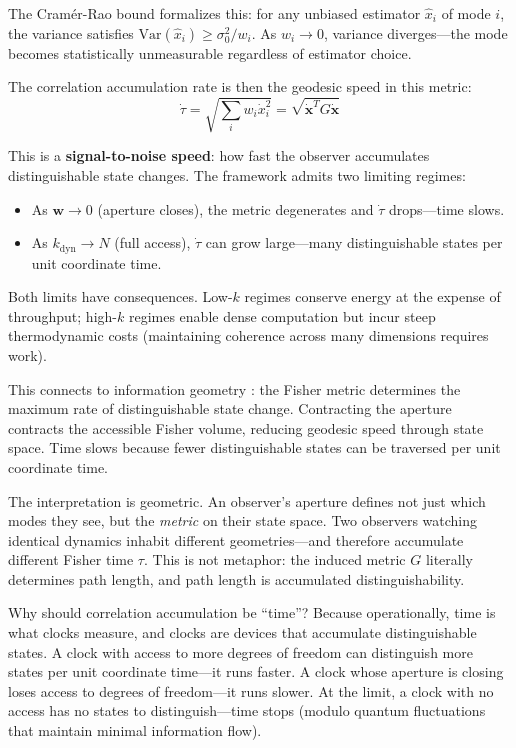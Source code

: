 \documentclass[11pt,a4paper]{article}
\begin{document}
The Cram\'{e}r-Rao bound formalizes this: for any unbiased estimator $\hat{x}_i$ of mode $i$, the variance satisfies $\mathrm{Var}(\hat{x}_i) \geq \sigma_0^2/w_i$. As $w_i \to 0$, variance diverges---the mode becomes statistically unmeasurable regardless of estimator choice.

The correlation accumulation rate is then the geodesic speed in this metric:
\begin{equation}
    \dot{\tau} = \sqrt{\sum_i w_i \dot{x}_i^2} = \sqrt{\dot{\mathbf{x}}^T G \dot{\mathbf{x}}}
\end{equation}

This is a \textbf{signal-to-noise speed}: how fast the observer accumulates distinguishable state changes. The framework admits two limiting regimes:
\begin{itemize}
    \item As $\mathbf{w} \to 0$ (aperture closes), the metric degenerates and $\dot{\tau}$ drops---time slows.
    \item As $k_{\mathrm{dyn}} \to N$ (full access), $\dot{\tau}$ can grow large---many distinguishable states per unit coordinate time.
\end{itemize}
Both limits have consequences. Low-$k$ regimes conserve energy at the expense of throughput; high-$k$ regimes enable dense computation but incur steep thermodynamic costs (maintaining coherence across many dimensions requires work).

This connects to information geometry \cite{amari2000}: the Fisher metric determines the maximum rate of distinguishable state change. Contracting the aperture contracts the accessible Fisher volume, reducing geodesic speed through state space. Time slows because fewer distinguishable states can be traversed per unit coordinate time.

The interpretation is geometric. An observer's aperture defines not just which modes they see, but the \emph{metric} on their state space. Two observers watching identical dynamics inhabit different geometries---and therefore accumulate different Fisher time $\tau$. This is not metaphor: the induced metric $G$ literally determines path length, and path length is accumulated distinguishability.

Why should correlation accumulation be ``time''? Because operationally, time is what clocks measure, and clocks are devices that accumulate distinguishable states. A clock with access to more degrees of freedom can distinguish more states per unit coordinate time---it runs faster. A clock whose aperture is closing loses access to degrees of freedom---it runs slower. At the limit, a clock with no access has no states to distinguish---time stops (modulo quantum fluctuations that maintain minimal information flow).
\end{document}
